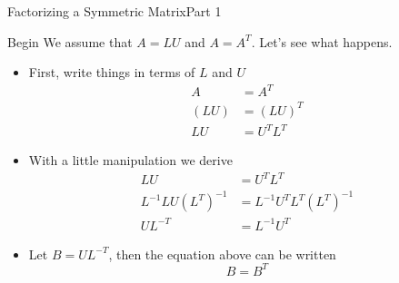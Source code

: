 \documentclass[10pt]{beamer}
\begin{document}

\begin{frame}{Factorizing a Symmetric Matrix}{Part 1}
\begin{block}{Begin}
We assume that $A = LU$ and $A = A^T$. Let's see what happens.
\end{block}
\begin{itemize}
    \item First, write things in terms of $L$ and $U$
          \begin{align*}
              A &= A^T\\ 
              (LU) &= (LU)^T\\
               LU  &= U^TL^T 
          \end{align*}
          
    \item With a little manipulation we derive 
          \begin{align*}
               LU  &= U^TL^T\\ 
               L^{-1}LU(L^{T})^{-1}  &= L^{-1}U^TL^T(L^{T})^{-1}\\ 
               UL^{-T}  &= L^{-1}U^T
          \end{align*}
    \item Let $B = U L^{-T}$, then the equation above can be written
        $$ B = B^T$$

\end{itemize}
\end{frame}
\end{document}
